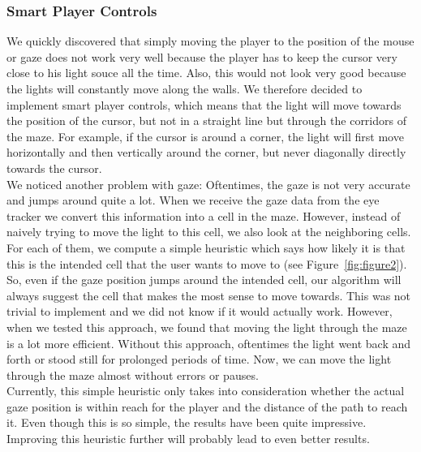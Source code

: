 \documentclass{sigchi}
\begin{document}
\subsubsection{Smart Player Controls} 
We quickly discovered that simply moving the player to the position of the mouse or gaze does not work very well because the player has to keep the cursor very close to his light souce all the time. Also, this would not look very good because the lights will constantly move along the walls. We therefore decided to implement smart player controls, which means that the light will move towards the position of the cursor, but not in a straight line but through the corridors of the maze. For example, if the cursor is around a corner, the light will first move horizontally and then vertically around the corner, but never diagonally directly towards the cursor. \\
We noticed another problem with gaze: Oftentimes, the gaze is not very accurate and jumps around quite a lot. When we receive the gaze data from the eye tracker we convert this information into a cell in the maze. However, instead of naively trying to move the light to this cell, we also look at the neighboring cells. For each of them, we compute a simple heuristic which says how likely it is that this is the intended cell that the user wants to move to  (see Figure~\ref{fig:figure2}). So, even if the gaze position jumps around the intended cell, our algorithm will always suggest the cell that makes the most sense to move towards. This was not trivial to implement and we did not know if it would actually work. However, when we tested this approach, we found that moving the light through the maze is a lot more efficient. Without this approach, oftentimes the light went back and forth or stood still for prolonged periods of time. Now, we can move the light through the maze almost without errors or pauses.\\
Currently, this simple heuristic only takes into consideration whether the actual gaze position is within reach for the player and the distance of the path to reach it. Even though this is so simple, the results have been quite impressive. Improving this heuristic further will probably lead to even better results.
\end{document}
